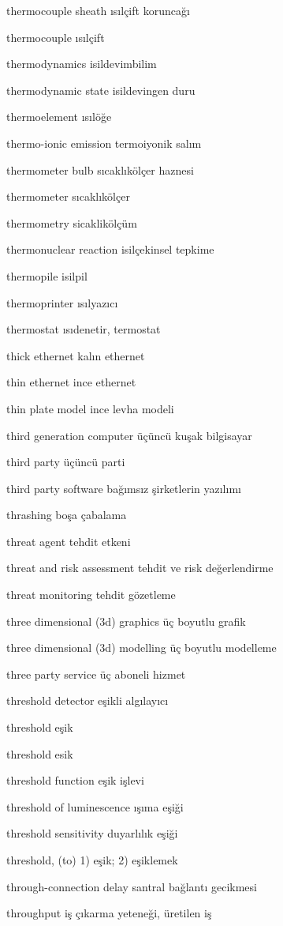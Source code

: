 \documentclass[12pt,fleqn]{article}\usepackage{../../common}
\begin{document}
thermocouple sheath ısılçift koruncağı

thermocouple ısılçift

thermodynamics isildevimbilim

thermodynamic state isildevingen duru

thermoelement ısılöğe

thermo-ionic emission termoiyonik salım

thermometer bulb sıcaklıkölçer haznesi

thermometer sıcaklıkölçer

thermometry sicaklikölçüm

thermonuclear reaction isilçekinsel tepkime

thermopile isilpil

thermoprinter ısılyazıcı

thermostat ısıdenetir, termostat

thick ethernet kalın ethernet

thin ethernet ince ethernet

thin plate model ince levha modeli

third generation computer üçüncü kuşak bilgisayar

third party üçüncü parti

third party software bağımsız şirketlerin yazılımı

thrashing boşa çabalama

threat agent tehdit etkeni

threat and risk assessment tehdit ve risk değerlendirme

threat monitoring tehdit gözetleme

three dimensional (3d) graphics üç boyutlu grafik

three dimensional (3d) modelling üç boyutlu modelleme

three party service üç aboneli hizmet

threshold detector eşikli algılayıcı

threshold eşik

threshold esik

threshold function eşik işlevi

threshold of luminescence ışıma eşiği

threshold sensitivity duyarlılık eşiği

threshold, (to) 1) eşik; 2) eşiklemek

through-connection delay santral bağlantı gecikmesi

throughput iş çıkarma yeteneği, üretilen iş
\end{document}
